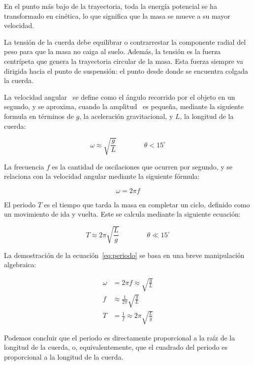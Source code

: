 \documentclass[letterpaper]{report}
\numberwithin{table}{section}
\begin{document}
En el punto más bajo de la trayectoria, toda la energía potencial se
ha transformado en cinética, lo que significa que la masa se mueve a
su mayor velocidad.

La tensión de la cuerda debe equilibrar o contrarrestar la componente
radial del peso para que la masa no caiga al suelo. Además, la
tensión es la fuerza centrípeta que genera la trayectoria circular de
la masa. Esta fuerza siempre va dirigida hacia el punto de
suspensión: el punto desde donde se encuentra colgada la cuerda.

La velocidad angular~\omega{} se define como el ángulo recorrido por
el objeto en un segundo, y se aproxima, cuando la amplitud~\theta{} es
pequeña, mediante la siguiente formula en términos de $g$, la
aceleración gravitacional, y $L$, la longitud de la cuerda:

\begin{equation}
  \omega \approx \sqrt{\frac{g}{L}} \qquad\qquad \theta < 15^{\circ}
\end{equation}

La frecuencia $f$ es la cantidad de oscilaciones que ocurren por
segundo, y se relaciona con la velocidad angular \omega{} mediante la
siguiente fórmula:

\begin{equation}
  \omega = 2 \pi f
\end{equation}

El periodo $T$ es el tiempo que tarda la masa en completar un ciclo,
definido como un movimiento de ida y vuelta. Este se calcula
mediante la siguiente ecuación:

\begin{equation}
  T \approx 2\pi\sqrt{\frac{L}{g}} \qquad\qquad \theta \ll 15^{\circ}
  \label{eq:periodo}
\end{equation}

La demostración de la ecuación~\eqref{eq:periodo} se basa en una
breve manipulación algebraica:

\begin{align*}
  \omega &= 2\pi f \approx \sqrt{\frac{g}{L}} \\
  f &\approx \frac{1}{2\pi}\sqrt{\frac{g}{L}} \\
  T &= \frac{1}{f} \approx 2\pi\sqrt{\frac{L}{g}}
\end{align*}

Podemos concluir que el periodo es directamente proporcional a la raíz de la
longitud de la cuerda, o, equivalentemente, que el cuadrado del periodo es
proporcional a la longitud de la cuerda.
\end{document}
